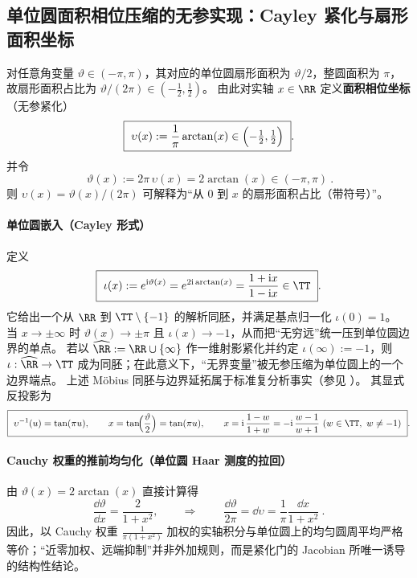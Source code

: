 \subsection{单位圆面积相位压缩的无参实现：Cayley 紧化与扇形面积坐标}\label{subsec:unit-circle-phase-lift}
对任意角变量 \(\vartheta\in(-\pi,\pi)\)，其对应的单位圆扇形面积为 \(\vartheta/2\)，整圆面积为 \(\pi\)，故扇形面积占比为 \(\vartheta/(2\pi)\in(-\tfrac12,\tfrac12)\)。
由此对实轴 \(x\in\RR\) 定义\textbf{面积相位坐标}（无参紧化）
\begin{equation}\label{eq:unit-circle-phase-upsilon}
\boxed{\ \upsilon(x):=\frac{1}{\pi}\arctan(x)\in\Bigl(-\tfrac12,\tfrac12\Bigr)\ }.
\end{equation}
并令
\begin{equation}\label{eq:unit-circle-phase-vartheta}
\boxed{\ \vartheta(x):=2\pi\,\upsilon(x)=2\arctan(x)\in(-\pi,\pi)\ }.
\end{equation}
则 \(\upsilon(x)=\vartheta(x)/(2\pi)\) 可解释为“从 \(0\) 到 \(x\) 的扇形面积占比（带符号）”。

\paragraph{单位圆嵌入（Cayley 形式）}
定义
\begin{equation}\label{eq:unit-circle-cayley-embed}
\boxed{\ \iota(x):=e^{\mathrm{i}\vartheta(x)}=e^{2\mathrm{i}\arctan(x)}=\frac{1+\mathrm{i}x}{1-\mathrm{i}x}\in\TT\ }.
\end{equation}
它给出一个从 \(\RR\) 到 \(\TT\setminus\{-1\}\) 的解析同胚，并满足基点归一化 \(\iota(0)=1\)。
当 \(x\to\pm\infty\) 时 \(\vartheta(x)\to\pm\pi\) 且 \(\iota(x)\to-1\)，从而把“无穷远”统一压到单位圆边界的单点。
若以 \(\widehat{\RR}:=\RR\cup\{\infty\}\) 作一维射影紧化并约定 \(\iota(\infty):=-1\)，则 \(\iota:\widehat{\RR}\to\TT\) 成为同胚；在此意义下，“无界变量”被无参压缩为单位圆上的一个边界端点。
上述 Möbius 同胚与边界延拓属于标准复分析事实（参见 \cite{Ahlfors1979ComplexAnalysis}）。
其显式反投影为
\begin{equation}\label{eq:unit-circle-phase-inverse}
\boxed{\ \upsilon^{-1}(u)=\tan(\pi u),\qquad x=\tan\!\Bigl(\frac{\vartheta}{2}\Bigr)=\tan(\pi u),\qquad
x=\mathrm{i}\,\frac{1-w}{1+w}=-\mathrm{i}\,\frac{w-1}{w+1}\ (w\in\TT,\ w\neq-1)\ }.
\end{equation}

\paragraph{Cauchy 权重的推前均匀化（单位圆 Haar 测度的拉回）}
由 \(\vartheta(x)=2\arctan(x)\) 直接计算得
\[
\frac{\dd\vartheta}{\dd x}=\frac{2}{1+x^{2}},
\qquad\Longrightarrow\qquad
\boxed{\ \frac{\dd\vartheta}{2\pi}=\dd\upsilon=\frac{1}{\pi}\frac{\dd x}{1+x^{2}}\ }.
\]
因此，以 Cauchy 权重 \(\frac{1}{\pi(1+x^{2})}\) 加权的实轴积分与单位圆上的均匀圆周平均严格等价；“近零加权、远端抑制”并非外加规则，而是紧化门的 Jacobian 所唯一诱导的结构性结论。

